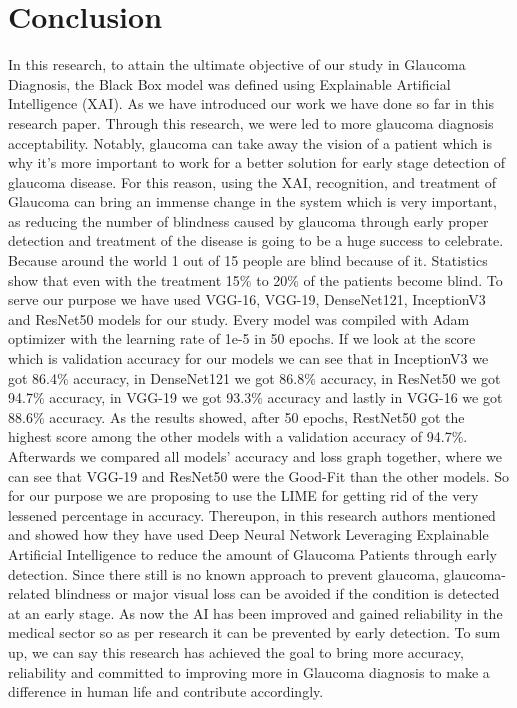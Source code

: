 \section{Conclusion} 
In this research, to attain the ultimate objective of our study in Glaucoma Diagnosis, the Black
Box model was defined using Explainable Artificial Intelligence (XAI). As we have introduced
our work we have done so far in this research paper. Through this research, we were led to more
glaucoma diagnosis acceptability. Notably, glaucoma can take away the vision of a patient which
is why it’s more important to work for a better solution for early stage detection of glaucoma
disease. For this reason, using the XAI, recognition, and treatment of Glaucoma can bring an
immense change in the system which is very important, as reducing the number of blindness
caused by glaucoma through early proper detection and treatment of the disease is going to be a
huge success to celebrate. Because around the world 1 out of 15 people are blind because of it.
Statistics show that even with the treatment 15\% to 20\% of the patients become blind. To serve
our purpose we have used VGG-16, VGG-19, DenseNet121, InceptionV3 and ResNet50 models
for our study. Every model was compiled with Adam optimizer with the learning rate of 1e-5 in
50 epochs. If we look at the score which is validation accuracy for our models we can see that in
InceptionV3 we got 86.4\% accuracy, in DenseNet121 we got 86.8\% accuracy, in ResNet50 we
got 94.7\% accuracy, in VGG-19 we got 93.3\% accuracy and lastly in VGG-16 we got 88.6\%
accuracy. As the results showed, after 50 epochs, RestNet50 got the highest score among the
other models with a validation accuracy of 94.7\%. Afterwards we compared all models' accuracy
and loss graph together, where we can see that VGG-19 and ResNet50 were the Good-Fit than
the other models. So for our purpose we are proposing to use the LIME for getting rid of the very
lessened percentage in accuracy. Thereupon, in this research authors mentioned and showed how
they have used Deep Neural Network Leveraging Explainable Artificial Intelligence to reduce
the amount of Glaucoma Patients through early detection. Since there still is no known approach
to prevent glaucoma, glaucoma-related blindness or major visual loss can be avoided if the
condition is detected at an early stage. As now the AI has been improved and gained reliability in
the medical sector so as per research it can be prevented by early detection. To sum up, we can
say this research has achieved the goal to bring more accuracy, reliability and committed to
improving more in Glaucoma diagnosis to make a difference in human life and contribute
accordingly.